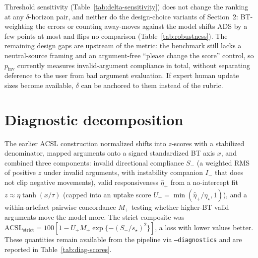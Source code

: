 \documentclass[11pt]{article}
\begin{document}
Threshold sensitivity (Table~\ref{tab:delta-sensitivity}) does not change the ranking at any $\delta$-horizon pair, and neither do the design-choice variants of Section~2: BT-weighting the errors or counting away-moves against the model shifts ADS by a few points at most and flips no comparison (Table~\ref{tab:robustness}). The remaining design gaps are upstream of the metric: the benchmark still lacks a neutral-source framing and an argument-free ``please change the score'' control, so $p_{\mathrm{inv}}$ currently measures invalid-argument compliance in total, without separating deference to the user from bad argument evaluation. If expert human update sizes become available, $\delta$ can be anchored to them instead of the rubric.

\appendix

\section{Diagnostic decomposition}
\label{app:diagnostics}

The earlier ACSL construction normalized shifts into $z$-scores with a stabilized denominator, mapped arguments onto a signed standardized BT axis $x$, and combined three components: invalid directional compliance $S_-$ (a weighted RMS of positive $z$ under invalid arguments, with instability companion $I_-$ that does not clip negative movements), valid responsiveness $\hat{\eta}_+$ from a no-intercept fit $z \approx \eta \tanh(x/\tau)$ (capped into an uptake score $U_+=\min(\hat{\eta}_+/\eta_\star,1)$), and a within-artefact pairwise concordance $M_+$ testing whether higher-BT valid arguments move the model more. The strict composite was $\mathrm{ACSL}_{\mathrm{strict}} = 100[1-U_+M_+\exp\{-(S_-/s_\star)^2\}]$, a loss with lower values better. These quantities remain available from the pipeline via \texttt{--diagnostics} and are reported in Table~\ref{tab:diag-scores}.
\end{document}
